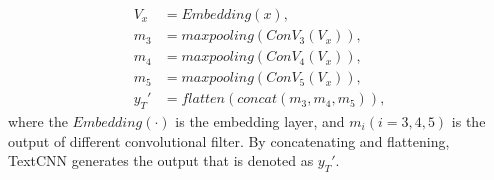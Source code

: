 \begin{align}\label{eq:tcnn}
V_x &= Embedding(x), \\
m_3 &= maxpooling(ConV_3(V_x)),\\
m_4 &= maxpooling(ConV_4(V_x)),\\
m_5 &= maxpooling(ConV_5(V_x)),\\
y_T' &= flatten(concat(m_3, m_4, m_5)),
\end{align}
where the $Embedding(\cdot)$ is the embedding layer, and $m_i (i = 3,4,5)$ is the output of different convolutional filter. By concatenating and flattening, TextCNN generates the output that is denoted as $y_T'$.